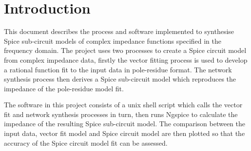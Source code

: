 \section{Introduction}\label{introduction}

This document describes the process and software implemented to synthesise Spice sub-circuit models of complex impedance functions specified in the frequency domain. The project uses two processes to create a Spice circuit model from complex impedance data, firstly the vector fitting process \cite{vectror_fit} is used to develop a rational function fit to the input data in pole-residue format. The network synthesis process \cite{network_synthesis} then derives a Spice sub-circuit model which reproduces the impedance of the pole-residue model fit.  

The software in this project consists of a unix shell script which calls the vector fit and network synthesis processes in turn, then runs Ngspice to calculate the impedance of the resulting Spice sub-circuit model. The comparison between the input data, vector fit model and Spice circuit model are then plotted so that the accuracy of the Spice circuit model fit can be assessed.
 
